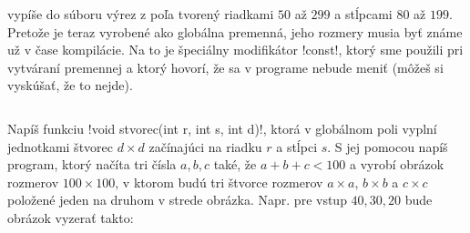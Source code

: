 vypíše do súboru  výrez z poľa   tvorený riadkami
$50$ až $299$ a stĺpcami $80$ až $199$. Pretože  je teraz vyrobené ako globálna
premenná, jeho rozmery musia byť známe už v čase kompilácie. Na to je špeciálny
modifikátor \prg!const!, ktorý sme použili pri vytváraní premennej  a ktorý
hovorí, že  sa v programe nebude meniť (môžeš si vyskúšať, že to nejde).

\begin{column}{0.7}
\begin{uloha}
  Napíš funkciu \prg!void stvorec(int r, int s, int d)!, ktorá v globálnom poli
  vyplní jednotkami štvorec $d\times d$ začínajúci na riadku $r$ a stĺpci $s$.
  S jej pomocou napíš program, ktorý načíta tri čísla $a, b, c$ také, že
  $a+b+c<100$ a vyrobí obrázok rozmerov $100\times 100$, v ktorom budú tri štvorce
  rozmerov $a\times a$, $b\times b$ a $c\times c$ položené jeden na druhom 
  v strede obrázka. Napr. pre vstup $40, 30, 20$ bude obrázok vyzerať takto:
\end{uloha}
\end{column}
\begin{column}{0.3}
 {
\setlength{\fboxsep}{0pt}
\centerline{}
  }
\end{column}  
